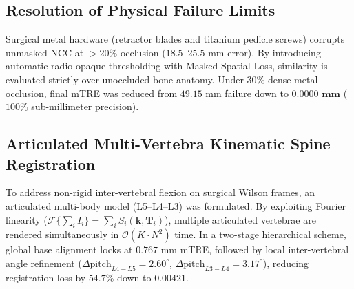 \documentclass[journal,twocolumn]{IEEEtran}
\begin{document}
\begin{table}[htbp]
\caption{Registration Robustness across Radiation Dose Reduction}
\label{tab:dose}
\centering
{}
\end{table}

\subsection{Resolution of Physical Failure Limits}
Surgical metal hardware (retractor blades and titanium pedicle screws) corrupts unmasked NCC at $>20\%$ occlusion ($18.5$–$25.5\text{ mm}$ error). By introducing automatic radio-opaque thresholding with Masked Spatial Loss, similarity is evaluated strictly over unoccluded bone anatomy. Under $30\%$ dense metal occlusion, final mTRE was reduced from $49.15\text{ mm}$ failure down to $\mathbf{0.0000\text{ mm}}$ ($100\%$ sub-millimeter precision).

\subsection{Articulated Multi-Vertebra Kinematic Spine Registration}
To address non-rigid inter-vertebral flexion on surgical Wilson frames, an articulated multi-body model (L5--L4--L3) was formulated. By exploiting Fourier linearity ($\mathcal{F}\{\sum_i I_i\} = \sum_i S_i(\mathbf{k}, \mathbf{T}_i)$), multiple articulated vertebrae are rendered simultaneously in $\mathcal{O}(K \cdot N^2)$ time. In a two-stage hierarchical scheme, global base alignment locks at $0.767\text{ mm}$ mTRE, followed by local inter-vertebral angle refinement ($\Delta \text{pitch}_{L4-L5} = 2.60^\circ$, $\Delta \text{pitch}_{L3-L4} = 3.17^\circ$), reducing registration loss by $54.7\%$ down to $0.00421$.
\end{document}
